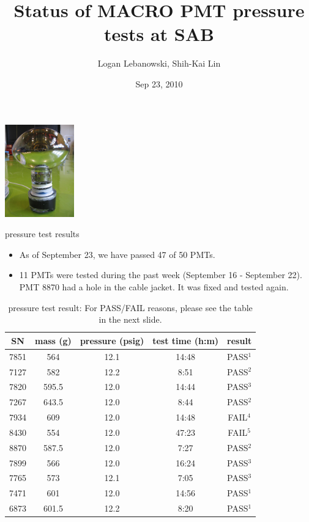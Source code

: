 \documentclass{beamer}
\begin{document}
\title{Status of MACRO PMT pressure tests at SAB}
\author{Logan Lebanowski, Shih-Kai Lin}
\date{Sep 23, 2010}

\begin{frame}
\begin{center}
\includegraphics[height=4cm]{IMG_1048.jpg}
\end{center}
\titlepage
\end{frame}


\begin{frame}{pressure test results}
\begin{itemize}
	\item As of September 23, we have passed 47 of 50 PMTs.
	\item 11 PMTs were tested during the past week (September 16 - September 22). PMT 8870
	had a hole in the cable jacket. It was fixed and tested again.
\end{itemize}
\begin{table}
\small
\begin{tabular}{c|c|c|c|c}
	SN & mass (g) & pressure (psig) & test time (h:m) & result \\
	\hline
	7851 & 564 & 12.1 & 14:48 & PASS$^1$ \\
	7127 & 582 & 12.2 & 8:51 & PASS$^2$ \\
	7820 & 595.5 & 12.0 & 14:44 & PASS$^3$ \\
	7267 & 643.5 & 12.0 & 8:44 & PASS$^2$ \\
	7934 & 609 & 12.0 & 14:48 & FAIL$^4$ \\
	8430 & 554 & 12.0 & 47:23 & FAIL$^5$ \\
	8870 & 587.5 & 12.0 & 7:27 & PASS$^2$ \\
	7899 & 566 & 12.0 & 16:24 & PASS$^3$ \\
	7765 & 573 & 12.1 & 7:05 & PASS$^3$ \\
	7471 & 601 & 12.0 & 14:56 & PASS$^1$ \\
	6873 & 601.5 & 12.2 & 8:20 & PASS$^1$ \\
\end{tabular}
\caption {pressure test result: For PASS/FAIL reasons, please see the table in the next slide.}
\end{table}
\end{frame}
\end{document}
